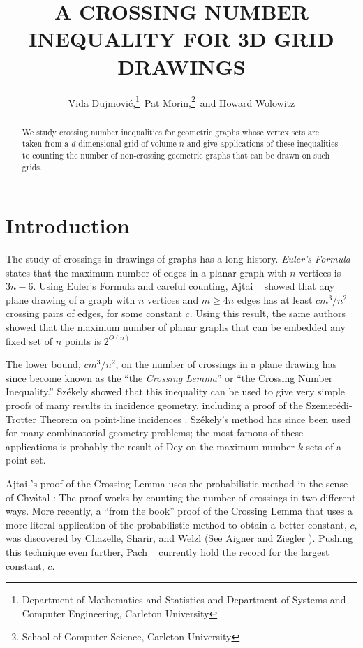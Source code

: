 \documentclass{patmorin}
\title{\MakeUppercase{A Crossing Number Inequality for 3D Grid Drawings}}
\author{Vida Dujmovi\'c,\thanks{Department of Mathematics and Statistics
and Department of Systems and Computer Engineering, Carleton University}\, Pat Morin,\thanks{School of Computer Science, Carleton University}\, and Howard Wolowitz}
\begin{document}
\maketitle

\begin{abstract}
   We study crossing number inequalities for geometric graphs whose
   vertex sets are taken from a $d$-dimensional grid of volume $n$
   and give applications of these inequalities to counting the number
   of non-crossing geometric graphs that can be drawn on such grids.
\end{abstract}

\section{Introduction}

The study of crossings in drawings of graphs has a long history.
\emph{Euler's Formula} states that the maximum number of edges in a
planar graph with $n$ vertices is $3n-6$.  Using Euler's Formula and
careful counting, Ajtai \etal\ \cite{S} showed that any plane drawing of
a graph with $n$ vertices and $m\ge 4n$ edges has at least $c m^3/n^2$
crossing pairs of edges, for some constant $c$.  Using this result,
the same authors showed that the maximum number of planar graphs that
can be embedded any fixed set of $n$ points is $2^{O(n)}$

The lower bound, $cm^3/n^2$, on the number of crossings in a plane
drawing has since become known as the ``the \emph{Crossing Lemma}''
or ``the Crossing Number Inequality.''  Sz\'ekely \cite{s} showed that
this inequality can be used to give very simple proofs of many results
in incidence geometry, including a proof of the Szemer\'edi-Trotter
Theorem on point-line incidences \cite{stXX}.  Sz\'ekely's method has
since been used for many combinatorial geometry problems; the most
famous of these applications is probably the result of Dey \cite{d98}
on the maximum number $k$-sets of a point set.

Ajtai \etal's proof of the Crossing Lemma uses the probabilistic method
in the sense of Chv\'atal \cite{cXX}: The proof works by counting the
number of crossings in two different ways.  More recently, a ``from the
book'' proof of the Crossing Lemma that uses a more literal application
of the probabilistic method to obtain a better constant, $c$, was
discovered by Chazelle, Sharir, and Welzl (See Aigner and Ziegler
\cite[Theorem~XX]{azXX}).  Pushing this technique even further, Pach
\etal\ \cite{pdxx} currently hold the record for the largest constant,
$c$.
\end{document}
